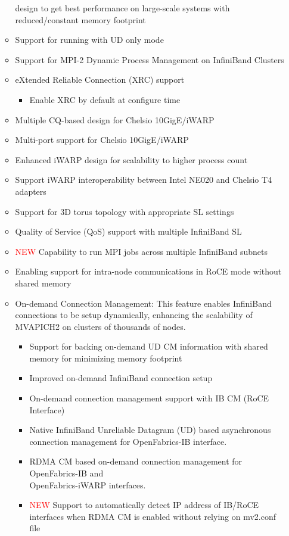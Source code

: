 \begin{itemize}
\begin{itemize}
           design to get best performance on large-scale systems with 
           reduced/constant memory footprint 
      \item  Support for running with UD only mode
      \item  Support for MPI-2 Dynamic  
           Process Management on InfiniBand Clusters 
      \item  eXtended Reliable 
           Connection (XRC) support 
             \begin{itemize}
               \item  Enable XRC by default at configure time
             \end{itemize}
      \item  Multiple CQ-based design for Chelsio 
           10GigE/iWARP 
      \item  Multi-port support for 
           Chelsio 10GigE/iWARP
      \item  Enhanced iWARP design for 
           scalability to higher process count
      \item  Support iWARP interoperability between Intel NE020 and Chelsio T4 adapters
      \item  Support for 3D torus topology 
           with appropriate SL settings
      \item  Quality of Service (QoS) support with multiple InfiniBand SL 
      \item  \textcolor{red}{NEW}  Capability to run MPI jobs across multiple InfiniBand subnets
      \item   Enabling support for intra-node communications in RoCE mode without 
	  shared memory
      \item  On-demand Connection Management: This feature enables
      InfiniBand connections to be setup dynamically, enhancing the
      scalability of MVAPICH2 on clusters of thousands of nodes. 
        \begin{itemize}
          \item  Support for backing on-demand UD CM information 
          with shared memory for minimizing memory footprint
          \item  Improved on-demand
          InfiniBand connection setup
          \item  On-demand connection 
          management support with IB CM (RoCE Interface) 
	  \item  Native InfiniBand Unreliable Datagram (UD) based
	  asynchronous connection management for OpenFabrics-IB
	  interface. 
	  \item  RDMA CM based on-demand
	  connection management for OpenFabrics-IB and \\
	  OpenFabrics-iWARP interfaces. 
      \item  \textcolor{red}{NEW} Support to automatically detect IP address of IB/RoCE interfaces when RDMA CM is enabled without relying on mv2.conf file
	\end{itemize}
      


\end{itemize}
\end{itemize}
